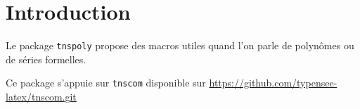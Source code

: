 \documentclass[12pt,a4paper]{article}
\begin{document}
\section{Introduction}

Le package \verb+tnspoly+ propose des macros utiles quand l'on parle de polynômes ou de séries formelles.

\begin{remark}
	Ce package s'appuie sur \verb+tnscom+ disponible sur \url{https://github.com/typensee-latex/tnscom.git}
\end{remark}
\end{document}
